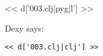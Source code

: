 << d['003.clj|pyg|l'] >>

\noindent Dexy says:
\begin{Verbatim}
<< d['003.clj|clj'] >>
\end{Verbatim}

